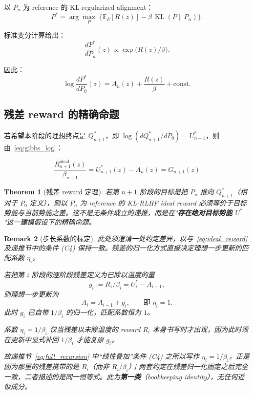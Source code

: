 \documentclass[11pt,a4paper]{article}
\newtheorem{theorem}{Theorem}[section]
\newtheorem{remark}[theorem]{Remark}
\DeclareMathOperator{\KL}{KL}
\newcommand{\E}{\mathbb{E}}
\begin{document}
以 $P_n$ 为 reference 的 KL-regularized alignment：
\begin{equation}\label{eq:kl_obj}
P^* = \arg\max_P\;\bigl\{\E_P[R(z)] - \beta\,\KL(P\|P_n)\bigr\}.
\end{equation}

标准变分计算给出：
\begin{equation}\label{eq:gibbs}
\frac{dP^*}{dP_n}(z) \propto \exp\!\bigl(R(z)/\beta\bigr).
\end{equation}

因此：
\begin{equation}\label{eq:gibbs_log}
\log\frac{dP^*}{dP_0}(z) = A_n(z) + \frac{R(z)}{\beta} + \text{const}.
\end{equation}

\subsection{残差 reward 的精确命题}

若希望本阶段的理想终点是 $Q_{n+1}^*$，即 $\log(dQ_{n+1}^*/dP_0) = U_{n+1}^*$，则由~\eqref{eq:gibbs_log}：

\begin{equation}\label{eq:ideal_reward}
\boxed{
\frac{R_{n+1}^{\mathrm{ideal}}(z)}{\beta_{n+1}} = U_{n+1}^*(z) - A_n(z) = G_{n+1}(z)
}
\end{equation}

\begin{theorem}[残差 reward 定理]\label{thm:residual_reward}
若第 $n{+}1$ 阶段的目标是把 $P_n$ 推向 $Q_{n+1}^*$（相对于 $P_0$ 定义），则以 $P_n$ 为 reference 的 KL-RLHF ideal reward 必须等价于目标势能与当前势能之差。这不是无条件成立的递推，而是在"\textbf{存在绝对目标势能 $U^*$}"这一建模假设下的精确命题。
\end{theorem}

\begin{remark}[步长系数的标定]\label{rem:eta_calib}
此处须澄清一处约定差异，以与~\eqref{eq:ideal_reward} 及递推节中的条件 (C4) 保持一致。残差的归一化方式直接决定理想一步更新的匹配系数 $\eta_i$。

若把第 $i$ 阶段的逐阶段残差定义为已除以温度的量
\[
g_i := R_i/\beta_i = U_i^* - A_{i-1},
\]
则理想一步更新为
\[
A_i = A_{i-1} + g_i,\qquad \text{即 } \eta_i = 1 .
\]
此时 $g_i$ 已自带 $1/\beta_i$ 的归一化，匹配系数恒为 $1$。

系数 $\eta_i = 1/\beta_i$ \emph{仅当}残差以未除温度的 reward $R_i$ 本身书写时才出现，因为此时须在更新中显式补回 $1/\beta_i$ 才能复原 $g_i$。

故递推节~\eqref{eq:full_recursion} 中“线性叠加”条件 (C4) 之所以写作 $\eta_i = 1/\beta_i$，正是因为那里的残差携带的是 $R_i$（而非 $R_i/\beta_i$）；两套约定在残差归一化固定之后完全一致，二者描述的是同一恒等式。此为\textbf{第一类}（bookkeeping identity），无任何近似成分。
\end{remark}
\end{document}
